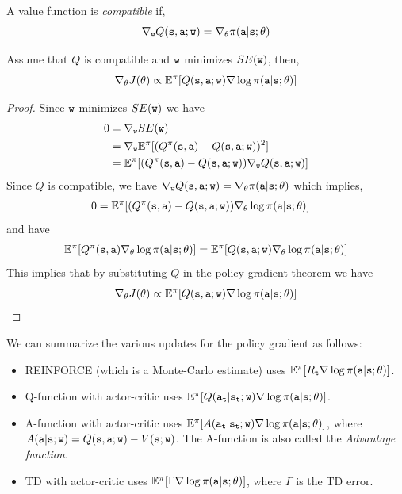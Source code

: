 A value function is {\em compatible} if,
\[
\nabla_{\tt w} Q({\tt s},{\tt a};{\tt w})= \nabla_\theta
\pi({\tt a}|{\tt s};\theta)
\]


\begin{theorem}
Assume that $Q$ is compatible and ${\tt w}$ minimizes $SE({\tt w})$,
then,
\[
\nabla_\theta J(\theta)\propto \mathbb{E}^\pi[Q({\tt s},{\tt a};{\tt w})
\nabla \log \pi({\tt a}|{\tt s};\theta)]
\]
\end{theorem}

\begin{proof}
Since ${\tt w}$ minimizes $SE({\tt w})$ we have
\begin{align*}
0 & = \nabla_{\tt w} SE({\tt w})\\
&= \nabla_{\tt w} \mathbb{E}^\pi[(Q^\pi({\tt s},{\tt a})-Q({\tt s},{\tt a};{\tt w}))^2]\\
&=
\mathbb{E}^\pi[(Q^\pi({\tt s},{\tt a})-Q({\tt s},{\tt a};{\tt w}))\nabla_{\tt w}
Q({\tt s},{\tt a};{\tt w})]
\end{align*}
Since $Q$ is compatible, we have $\nabla_{\tt w}
Q({\tt s},{\tt a};{\tt w})= \nabla_\theta
\pi({\tt a}|{\tt s};\theta)$ which implies,
\begin{align*}
0&=
\mathbb{E}^\pi[(Q^\pi({\tt s},{\tt a})-Q({\tt s},{\tt a};{\tt w}))\nabla_\theta
\log \pi({\tt a}|{\tt s};\theta)]
\end{align*}
and have
\begin{align*}
 \mathbb{E}^\pi[Q^\pi({\tt s},{\tt a})\nabla_\theta \log \pi({\tt a}|{\tt s};\theta)] = \mathbb{E}^\pi[Q({\tt s},{\tt a};{\tt w})\nabla_\theta \log \pi({\tt a}|{\tt s};\theta)]
\end{align*}
This implies that by substituting $Q$ in the policy gradient theorem
we have
\[
\nabla_\theta J(\theta) \propto \mathbb{E}^\pi[Q({\tt s},{\tt a};{\tt w})
\nabla \log \pi({\tt a}|{\tt s};\theta)]
\]
\end{proof}

We can summarize the various updates for the policy gradient as
follows:
\begin{itemize}
\item REINFORCE (which is a Monte-Carlo estimate) uses
$\mathbb{E}^\pi[R_{\tt t} \nabla\log\pi({\tt a}|{\tt s};\theta) ]$.
\item Q-function with actor-critic uses
$\mathbb{E}^\pi[Q({\tt a}_{\tt t}|{\tt s}_{\tt t};{\tt w})
\nabla\log\pi({\tt a}|{\tt s};\theta) ]$.
\item A-function with actor-critic uses
$\mathbb{E}^\pi[A({\tt a}_{\tt t}|{\tt s}_{\tt t};{\tt w})
\nabla\log\pi({\tt a}|{\tt s};\theta) ]$, where
$A({\tt a}|{\tt s};{\tt w})=Q({\tt s},{\tt a};{\tt w})-V({\tt s};{\tt w})$. The A-function is also called the \emph{Advantage function}.
\item TD with actor-critic uses
$\mathbb{E}^\pi[\Gamma\nabla\log\pi({\tt a}|{\tt s};\theta) ]$, where
$\Gamma$ is the TD error.
\end{itemize}

